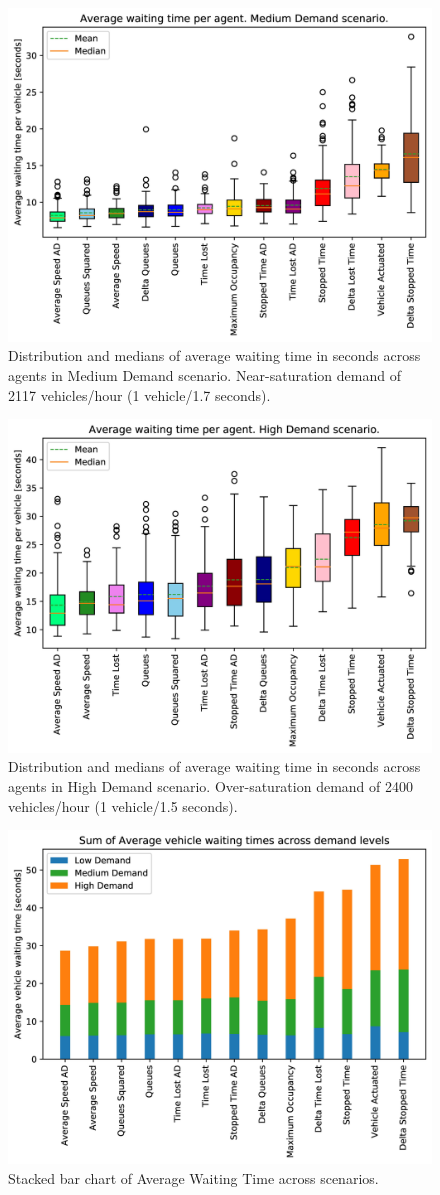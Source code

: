 \documentclass{article}
\begin{document}
\begin{figure}[thpb]
    \centering
    \includegraphics[width=.7\linewidth]{figures/rand_1_7_ordered_color_DS.jpg}
    \caption{Distribution and medians of average waiting time in seconds across agents in Medium Demand scenario. Near-saturation demand of 2117 vehicles/hour (1 vehicle/1.7 seconds).}
    \label{fig:mid}
\end{figure}

\begin{figure}[thpb]
    \centering
    \includegraphics[width=.7\linewidth]{figures/rand_1_5_ordered_color_DS.jpg}
    \caption{Distribution and medians of average waiting time in seconds across agents in High Demand scenario. Over-saturation demand of 2400 vehicles/hour (1 vehicle/1.5 seconds).}
    \label{fig:high}
\end{figure}

\begin{figure}[thpb]
    \centering
    \includegraphics[width=.7\linewidth]{figures/stacked_average_delay_ordered_by_sum_DS.jpg}
    \caption{Stacked bar chart of Average Waiting Time across scenarios.}
    \label{fig:stack}
\end{figure}
\end{document}
